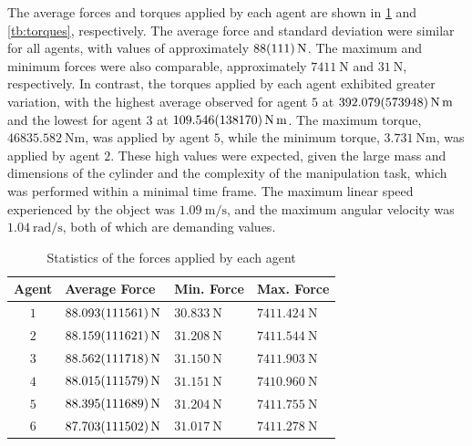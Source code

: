 The average forces and torques applied by each agent are shown in \cref{tb:forces} and \cref{tb:torques}, respectively. The average force and standard deviation were similar for all agents, with values of approximately $\qty{88 \pm 111}{\newton}$. The maximum and minimum forces were also comparable, approximately $\qty{7411}{\newton}$ and $\qty{31}{\newton}$, respectively. In contrast, the torques applied by each agent exhibited greater variation, with the highest average observed for agent $5$ at $\qty{392.079 \pm 573.948}{\newton\meter}$ and the lowest for agent $3$ at $\qty{109.546 \pm 138.17}{\newton\meter}$. The maximum torque, $\qty{46835.582}{\newton\meter}$, was applied by agent $5$, while the minimum torque, $\qty{3.731}{\newton\meter}$, was applied by agent $2$. These high values were expected, given the large mass and dimensions of the cylinder and the complexity of the manipulation task, which was performed within a minimal time frame. The maximum linear speed experienced by the object was $\qty{1.09}{\meter\per\second}$, and the maximum angular velocity was $\qty{1.04}{\radian\per\second}$, both of which are demanding values.
\begin{table}[ht]
    \centering
    \caption{Statistics of the forces applied by each agent}\label{tb:forces}
    \begin{tabular}{clll}
    Agent & Average Force & Min. Force & Max. Force\\\hline
    $1$ & $\qty{88.093 \pm 111.561}{\newton}$ & $\qty{30.833}{\newton}$ & $\qty{7411.424}{\newton}$ \\
    $2$ & $\qty{88.159 \pm 111.621}{\newton}$ & $\qty{31.208}{\newton}$ & $\qty{7411.544}{\newton}$ \\
    $3$ & $\qty{88.562 \pm 111.718}{\newton}$ & $\qty{31.150}{\newton}$ & $\qty{7411.903}{\newton}$ \\
    $4$ & $\qty{88.015 \pm 111.579}{\newton}$ & $\qty{31.151}{\newton}$ & $\qty{7410.960}{\newton}$ \\
    $5$ & $\qty{88.395 \pm 111.689}{\newton}$ & $\qty{31.204}{\newton}$ & $\qty{7411.755}{\newton}$ \\
    $6$ & $\qty{87.703 \pm 111.502}{\newton}$ & $\qty{31.017}{\newton}$ & $\qty{7411.278}{\newton}$
    \\\hline
    \end{tabular}
\end{table}
